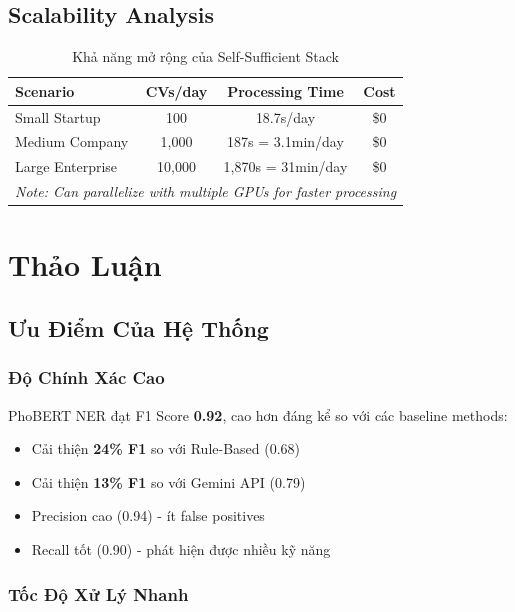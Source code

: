 \subsection{Scalability Analysis}

\begin{table}[h]
\centering
\caption{Khả năng mở rộng của Self-Sufficient Stack}
\label{tab:scalability}
\begin{tabular}{lccc}
\hline
\textbf{Scenario} & \textbf{CVs/day} & \textbf{Processing Time} & \textbf{Cost} \\
\hline
Small Startup & 100 & 18.7s/day & \$0 \\
Medium Company & 1,000 & 187s = 3.1min/day & \$0 \\
Large Enterprise & 10,000 & 1,870s = 31min/day & \$0 \\
\hline
\multicolumn{4}{l}{\textit{Note: Can parallelize with multiple GPUs for faster processing}} \\
\hline
\end{tabular}
\end{table}

\section{Thảo Luận}
\label{sec:discussion}

\subsection{Ưu Điểm Của Hệ Thống}

\subsubsection{Độ Chính Xác Cao}

PhoBERT NER đạt F1 Score \textbf{0.92}, cao hơn đáng kể so với các baseline methods:
\begin{itemize}
    \item Cải thiện \textbf{24\% F1} so với Rule-Based (0.68)
    \item Cải thiện \textbf{13\% F1} so với Gemini API (0.79)
    \item Precision cao (0.94) - ít false positives
    \item Recall tốt (0.90) - phát hiện được nhiều kỹ năng
\end{itemize}

\subsubsection{Tốc Độ Xử Lý Nhanh}

